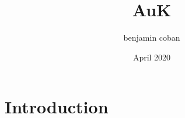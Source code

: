\documentclass{article}
\title{AuK}
\author{benjamin coban}
\date{April 2020}
\begin{document}
\maketitle

\section{Introduction}
\end{document}
